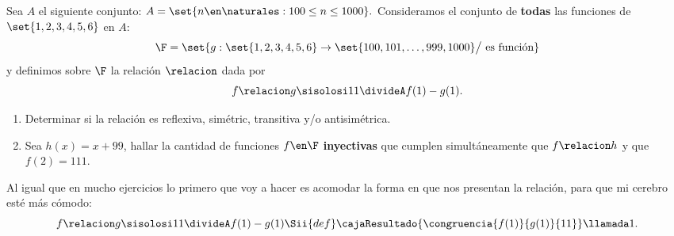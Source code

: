 \begin{enunciado}{\ejExtra}
  Sea $A$ el siguiente conjunto: $A = \set{n \en \naturales :  100 \leq n \leq 1000}.$ Consideramos el conjunto
  de \textbf{todas} las funciones de $\set{1,2,3,4,5,6}$ en $A$:
  $$
    \F = \set{g: \set{1,2,3,4,5,6} \to \set{100,101,\dots,999,1000} \big/ \text{ es función}}
  $$
  y definimos sobre $\F$ la relación $\relacion$ dada por
  $$
    f \relacion g \sisolosi 11 \divideA f(1) - g(1).
  $$
  \begin{enumerate}[label=\alph*)]
    \item Determinar si la relación es reflexiva, simétric, transitiva y/o antisimétrica.

    \item Sea $h(x) = x + 99$, hallar la cantidad de funciones $f \en \F$ \textbf{inyectivas} que cumplen simultáneamente que
          $f \relacion h$ y que $f(2) = 111$.
  \end{enumerate}
\end{enunciado}

Al igual que en mucho ejercicios lo primero que voy a hacer es acomodar la forma en que nos presentan la relación, para que mi
cerebro esté más cómodo:
$$
  f \relacion g \sisolosi 11 \divideA f(1) - g(1)
  \Sii{def}
  \cajaResultado{\congruencia{f(1)}{g(1)}{11}}\llamada1.
$$


